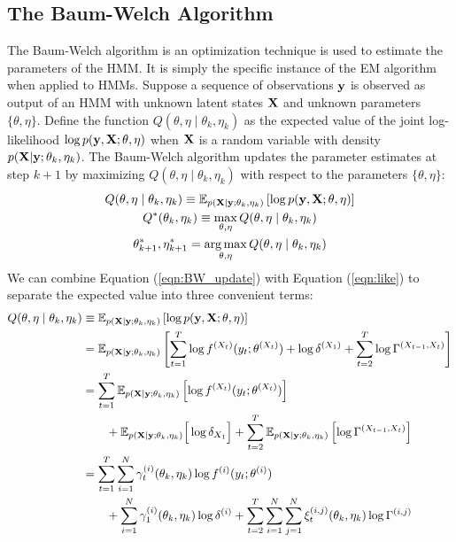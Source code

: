 \subsection{The Baum-Welch Algorithm}

The Baum-Welch algorithm is an optimization technique is used to estimate the parameters of the HMM. It is simply the specific instance of the EM algorithm when applied to HMMs. Suppose a sequence of observations $\mathbf{y}$ is observed as output of an HMM with unknown latent states $\mathbf{X}$ and unknown parameters $\{\theta,\eta\}$. Define the function $Q(\theta,\eta \mid \theta_{k},\eta_{k})$ as the expected value of the joint log-likelihood $\log p(\mathbf{y},\mathbf{X}; \theta,\eta)$ when $\mathbf{X}$ is a random variable with density $p(\mathbf{X} | \mathbf{y};\theta_{k},\eta_{k})$. The Baum-Welch algorithm updates the parameter estimates at step $k+1$ by maximizing $Q(\theta,\eta \mid \theta_{k},\eta_{k})$ with respect to the parameters $\{\theta,\eta\}$:
%
\begin{gather}
    Q(\theta,\eta \mid \theta_{k},\eta_{k}) \equiv \mathbb{E}_{p(\mathbf{X} \mid \mathbf{y};\theta_{k},\eta_{k})}\left[\log p(\mathbf{y},\mathbf{X};\theta,\eta) \right]
    \label{eqn:BW_update} \\
    Q^*(\theta_{k},\eta_{k}) \equiv \max_{\theta,\eta}Q(\theta,\eta \mid \theta_{k},\eta_{k}) \\
    \theta^*_{k+1},\eta^*_{k+1} = \operatorname*{arg\,max}_{\theta,\eta} Q(\theta,\eta \mid \theta_{k},\eta_{k})
\end{gather}
%
We can combine Equation (\ref{eqn:BW_update}) with Equation (\ref{eqn:like}) to separate the expected value into three convenient terms:
\begin{align*}
    Q(\theta,\eta \mid \theta_{k},\eta_{k}) &\equiv \mathbb{E}_{p(\mathbf{X} \mid \mathbf{y};\theta_{k},\eta_{k})}\left[\log p(\mathbf{y},\mathbf{X};\theta,\eta) \right] \\
    &= \mathbb{E}_{p(\mathbf{X} \mid \mathbf{y};\theta_{k},\eta_{k})} \left[\sum_{t=1}^T \log f^{(X_t)}(y_t;\theta^{(X_t)}) + \log \delta^{(X_1)} + \sum_{t=2}^{T} \log \Gamma^{(X_{t-1},X_{t})} \right] \\
    &= \sum_{t = 1}^T \mathbb{E}_{p(\mathbf{X} \mid \mathbf{y};\theta_{k},\eta_{k})} \left[ \log f^{(X_t)}(y_t;\theta^{(X_t)})\right]  \\
    & \qquad + \mathbb{E}_{p(\mathbf{X} \mid \mathbf{y};\theta_{k},\eta_{k})} \Big[\log \delta_{X_1}\Big] + \sum_{t=2}^{T} \mathbb{E}_{p(\mathbf{X} \mid \mathbf{y};\theta_{k},\eta_{k})} \left[ \log \Gamma^{(X_{t-1},X_{t})} \right] \\
    &= \sum_{t = 1}^T \sum_{i=1}^N \gamma^{(i)}_t(\theta_{k},\eta_{k}) \log f^{(i)}(y_t;\theta^{(i)}) \\
    & \qquad + \sum_{i=1}^N \gamma^{(i)}_1(\theta_{k},\eta_{k}) \log \delta^{(i)} + \sum_{t=2}^{T} \sum_{i=1}^N \sum_{j=1}^N \xi_t^{(i,j)}(\theta_{k},\eta_{k}) \log \Gamma^{(i,j)} 
\end{align*}

